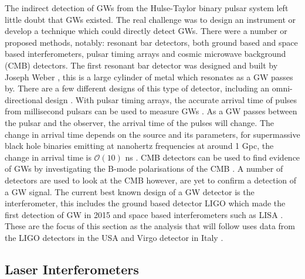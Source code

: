 The indirect detection of \glspl{GW} from the Hulse-Taylor binary
pulsar system \citep{weisberg1981GravitationalWaves} left little doubt that \glspl{GW} existed.  The
real challenge was to design an instrument or develop a technique which could directly detect
\glspl{GW}. There were a number or proposed methods, notably: resonant bar detectors, both
ground based and space based interferometers, pulsar timing arrays and cosmic microwave background (CMB)
detectors. The first resonant bar detector was designed and built by Joseph
Weber \citep{weber1966ObservationThermal}, this is a large cylinder of metal
which resonates as a \gls{GW} passes by.  There are a few different designs
of this type of detector, including an omni-directional design
\citep{dewaard2003MiniGRAILFirst}. 
With pulsar timing arrays, the accurate arrival time of pulses
from millisecond pulsars can be used to measure \glspl{GW}
\citep{hobbs2017GravitationalWave}. As a \gls{GW} passes between the pulsar and
the observer, the arrival time of the pulses will change. The change in arrival time depends on the source and its parameters, for supermassive black hole binaries emitting at nanohertz frequencies at around 1 Gpc, the change in arrival time is $\mathcal{O}(10)$ ns \citep{hobbs2017GravitationalWave}.  \gls{CMB} detectors can be used to find evidence of \glspl{GW} by investigating the B-mode polarisations of the \gls{CMB}
\citep{ade2018ConstraintsPrimordial}. A number of
detectors are used to look at the \gls{CMB} however, are yet to
confirm a detection of a \gls{GW} signal.  
The current best known design of a \gls{GW} detector is the interferometer, this includes the ground based detector \gls{LIGO} \citep{aasi2015AdvancedLIGO}
which made the first detection of \gls{GW} in 2015
\citep{abbott2016ObservationGravitational} and space based interferometers such as \gls{LISA} \citep{danzmann1996LISALaser}.  These are the focus of this
section as the analysis that will follow uses data from the \gls{LIGO}
detectors in the USA \citep{abbott2009LIGOLaser,aasi2015AdvancedLIGO} and Virgo
detector in Italy
\citep{acernese2015AdvancedVirgo,acernese2008StatusVirgo}.

\subsection{\label{intro:detector:ligo}Laser Interferometers}

